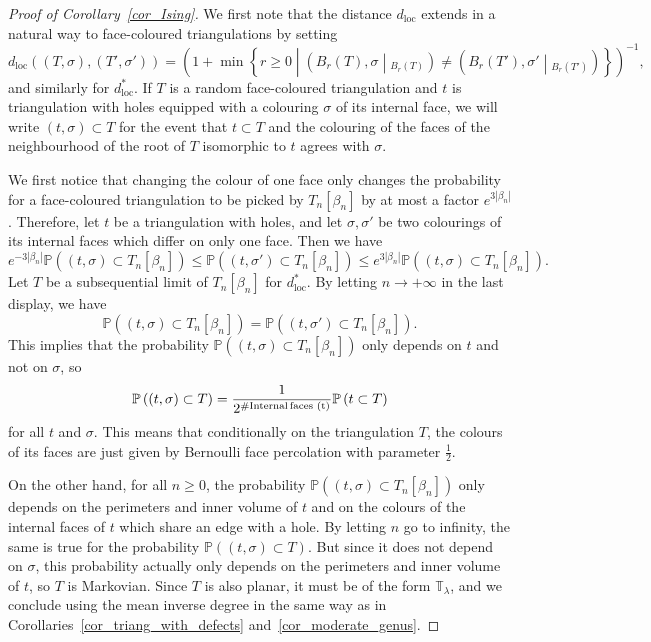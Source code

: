 \documentclass[10pt]{amsart}
\theoremstyle{definition}\newtheorem{defi}[theo]{Definition}\newtheorem{rema}[theo]{Remark}\newtheorem{exam}[theo]{Example}\newtheorem{exem}[theo]{Example}\newtheorem{nota}[theo]{Notation}
\newcommand{\loc}{\mathrm{loc}}
\newcommand{\TT}{\mathbb{T}}
\renewcommand{\P}{\mathbb{P}}
\begin{document}
\begin{proof}[Proof of Corollary~\ref{cor_Ising}]
We first note that the distance $d_{\loc}$ extends in a natural way to face-coloured triangulations by setting
\[
d_{\loc}\left((T,\sigma),(T', \sigma') \right) = \left(1+\min \left\{ r \geq 0 \middle| \left(B_r(T), \sigma\middle|_{B_r(T)} \right) \ne \left(B_r(T'), \sigma'\middle|_{B_r(T')} \right) \right\}\right)^{-1},
\]
and similarly for $d_{\loc}^*$. If $T$ is a random face-coloured triangulation and $t$ is triangulation with holes equipped with a colouring $\sigma$ of its internal face, we will write $(t,\sigma) \subset T$ for the event that $t \subset T$ and the colouring of the faces of the neighbourhood of the root of $T$ isomorphic to $t$ agrees with $\sigma$.

We first notice that changing the colour of one face only changes the probability for a face-coloured triangulation to be picked by $T_n[\beta_n]$ by at most a factor $e^{3 |\beta_n|}$. Therefore, let $t$ be a triangulation with holes, and let $\sigma, \sigma'$ be two colourings of its internal faces which differ on only one face. Then we have
\[
e^{-3\left|\beta_n\right|} \P \left((t,\sigma) \subset T_n[\beta_n] \right) \leq \P \left((t,\sigma') \subset T_n[\beta_n] \right) \leq e^{3\left|\beta_n\right|} \P \left((t,\sigma) \subset T_n[\beta_n] \right).
\]
Let $T$ be a subsequential limit of $T_n[\beta_n]$ for $d_{\loc}^*$. By letting $n \to +\infty$ in the last display, we have
\[
\P \left((t,\sigma) \subset T_n[\beta_n] \right) = \P \left((t,\sigma') \subset T_n[\beta_n] \right).
\]
This implies that the probability $\P \left((t,\sigma) \subset T_n[\beta_n] \right)$ only depends on $t$ and not on $\sigma$, so
\[
\P \left((t,\sigma) \subset T \right) = \frac{1}{2^{\# \text{Internal\,faces (t)}}} \P \left(t \subset T \right)
\]
for all $t$ and $\sigma$. This means that conditionally on the triangulation $T$, the colours of its faces are just given by Bernoulli face percolation with parameter $\frac{1}{2}$.

On the other hand, for all $n \geq 0$, the probability $\P \left((t,\sigma) \subset T_n[\beta_n] \right)$ only depends on the perimeters and inner volume of $t$ and on the colours of the internal faces of $t$ which share an edge with a hole. By letting $n$ go to infinity, the same is true for the probability $\P \left((t,\sigma) \subset T \right)$. But since it does not depend on $\sigma$, this probability actually only depends on the perimeters and inner volume of $t$, so $T$ is Markovian. Since $T$ is also planar, it must be of the form $\TT_{\lambda}$, and we conclude using the mean inverse degree in the same way as in Corollaries~\ref{cor_triang_with_defects} and~\ref{cor_moderate_genus}.
\end{proof}
\end{document}
